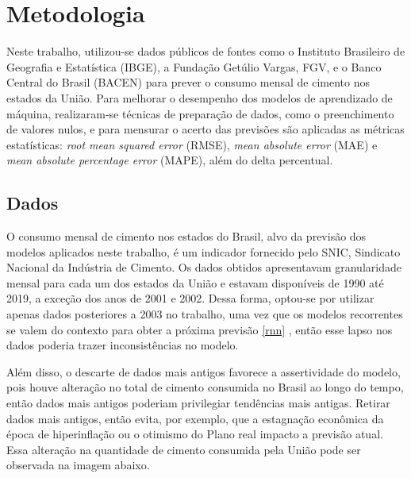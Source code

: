 
\chapter{Metodologia}

Neste trabalho, utilizou-se dados públicos de fontes como o Instituto Brasileiro 
de Geografia e Estatística (IBGE), a Fundação Getúlio Vargas, FGV, e o 
Banco Central do Brasil (BACEN) para prever o consumo mensal de 
cimento nos estados da União. Para melhorar o desempenho dos modelos de 
aprendizado de máquina, realizaram-se técnicas
de preparação de dados, como o preenchimento de valores nulos, e para mensurar 
o acerto das previsões são aplicadas as métricas estatísticas: \textit {root 
mean squared error} (RMSE),  \textit{mean absolute error} (MAE) e \textit{mean 
absolute percentage error} (MAPE), além do delta percentual.


\section{Dados}


O consumo mensal de cimento nos estados do Brasil, alvo da previsão 
dos modelos aplicados neste trabalho, é um indicador fornecido pelo SNIC, 
Sindicato Nacional da Indústria de Cimento. Os dados obtidos apresentavam granularidade
mensal para cada um dos estados da União e estavam disponíveis de 1990 até 2019,
a exceção dos anos de 2001 e 2002. Dessa forma, optou-se por utilizar apenas 
dados posteriores a 2003 no trabalho, uma vez que os modelos recorrentes se 
valem do contexto para obter a próxima previsão \ref{rnn} , então esse lapso nos dados
poderia trazer inconsistências no modelo.

Além disso, o descarte de dados mais antigos favorece a assertividade do 
modelo, pois houve alteração no total de cimento consumida no Brasil
ao longo do tempo, então dados mais antigos poderiam privilegiar tendências 
mais antigas. Retirar dados mais antigos, então evita, por exemplo, que a 
estagnação econômica da época de hiperinflação ou o otimismo do Plano real
impacto a previsão atual. Essa alteração na quantidade de cimento consumida pela União
pode ser observada na imagem abaixo. 

